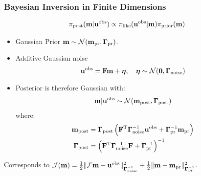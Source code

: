 \documentclass[
  pdf,
  10pt,
  xcolor={svgnames},
]{beamer}
\newcommand{\mc}[1]{\mathcal{#1}}
\newcommand{\T}{\mathrm{T}}
\newcommand{\mat}[1]{\mathbf{{#1}}}
\newcommand{\obs}{\mathbf{u}^{\rm obs}}
\begin{document}
\begin{frame}
  \frametitle{Bayesian Inversion in Finite Dimensions}
  \begin{theorem}
    \[
      \pi_{\rm post}(\vb{m} | \mathbf{u}^{\rm obs})
      \propto
      \pi_{\rm like}(\mathbf{u}^{\rm obs} | \vb{m})
      \pi_{\rm prior}(\vb{m})
    \]
  \end{theorem}
  \begin{itemize}
    \item Gaussian Prior $\vb{m} \sim \mc{N}(\vb{m}_{\rm pr}, \mat{\Gamma}_{\rm pr})$.
    \item Additive Gaussian noise
      \[
        \obs = \mat{F} \vb{m} + \vb*{\eta},
        \quad \vb*{\eta} \sim \mc{N}(\vb{0}, \mat{\Gamma}_{\rm noise})
      \]
    \item Posterior is therefore Gaussian with:
      \[
        \vb{m} | \mathbf{u}^{\rm obs} 
        \sim \mc{N}(\vb{m}_{\rm post} , \vb{\Gamma}_{\rm post})
      \]
      where:
      \begin{align*}
        \vb{m}_{\rm post}
        &=
        \vb{\Gamma}_{\rm post}
        \left(
          \mat{F}^\T \vb{\Gamma}_{\rm noise}^{-1} \mathbf{u}^{\rm obs}
          + \vb{\Gamma}_{\rm pr}^{-1} \vb{m}_{\rm pr}
        \right) \\
        \vb{\Gamma}_{\rm post}
        &=
        \left(
          \mat{F}^\T \vb{\Gamma}_{\rm noise}^{-1} \mat{F}
          + \vb{\Gamma}_{\rm pr}^{-1}
        \right)^{-1} \\
      \end{align*}
  \end{itemize}
  Corresponds to
  \(
    \mc{J}(\vb{m})
    = \frac{1}{2} \| \mc{F}\vb{m} - \obs \|_{\vb{\Gamma}_{\rm noise}^{-1}}^2
    + \frac{1}{2} \| \vb{m} - \vb{m}_{\rm pr}\|_{\vb{\Gamma}_{\rm pr}^{-1}}^2
  \).
\end{frame}
\end{document}

